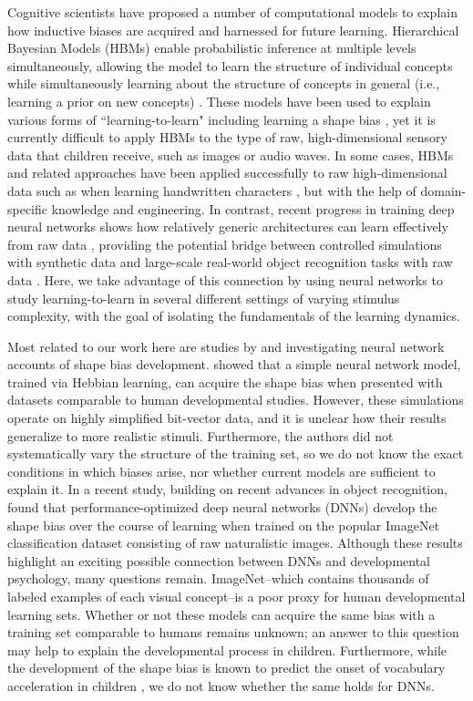 Cognitive scientists have proposed a number of computational models to explain
how inductive biases are acquired and harnessed for future learning.
Hierarchical Bayesian Models (HBMs) enable probabilistic inference at multiple
levels simultaneously, allowing the model to learn the structure of individual
concepts while simultaneously learning about the structure of concepts in
general (i.e., learning a prior on new concepts)
\citep{Gelman2013, Kemp2007, Salakhutdinov2012}. These models have been used to
explain various forms of ``learning-to-learn" including learning a shape bias
\citep{Kemp2007}, yet it is currently difficult to apply HBMs to the type of
raw, high-dimensional sensory data that children receive, such as images or
audio waves. In some cases, HBMs and related approaches have been applied
successfully to raw high-dimensional data such as when learning handwritten
characters \citep{Lake2015}, but with the help of domain-specific knowledge and
engineering. In contrast, recent progress in training deep neural networks
shows how relatively generic architectures can learn effectively from raw data
\citep{LeCun2015}, providing the potential bridge between controlled simulations
with synthetic data \citep[e.g.,][]{Colunga2005} and large-scale real-world
object recognition tasks with raw data \citep[e.g.,][]{Ritter2017}. Here, we
take advantage of this connection by using neural networks to study
learning-to-learn in several different settings of varying stimulus complexity,
with the goal of isolating the fundamentals of the learning dynamics.

Most related to our work here are studies by \cite{Colunga2005} and
\cite{Ritter2017} investigating neural network accounts of shape bias
development. \cite{Colunga2005} showed that a simple neural network model,
trained via Hebbian learning, can acquire the shape bias when presented with
datasets comparable to human developmental studies. However, these simulations
operate on highly simplified bit-vector data, and it is unclear how their
results generalize to more realistic stimuli. Furthermore, the authors did not
systematically vary the structure of the training set, so we do not know the
exact conditions in which biases arise, nor whether current models are
sufficient to explain it. In a recent study, building on recent advances in
object recognition, \cite{Ritter2017} found that performance-optimized deep
neural networks (DNNs) develop the shape bias over the course of learning when
trained on the popular ImageNet classification dataset consisting of raw
naturalistic images. Although these results highlight an exciting possible
connection between DNNs and developmental psychology, many questions remain.
ImageNet--which contains thousands of labeled examples of each visual
concept--is a poor proxy for human developmental learning sets. Whether or not
these models can acquire the same bias with a training set comparable to humans
remains unknown; an answer to this question may help to explain the
developmental process in children. Furthermore, while the development of the
shape bias is known to predict the onset of vocabulary acceleration in children
\citep{GershkoffStowe2004}, we do not know whether the same holds for DNNs.

